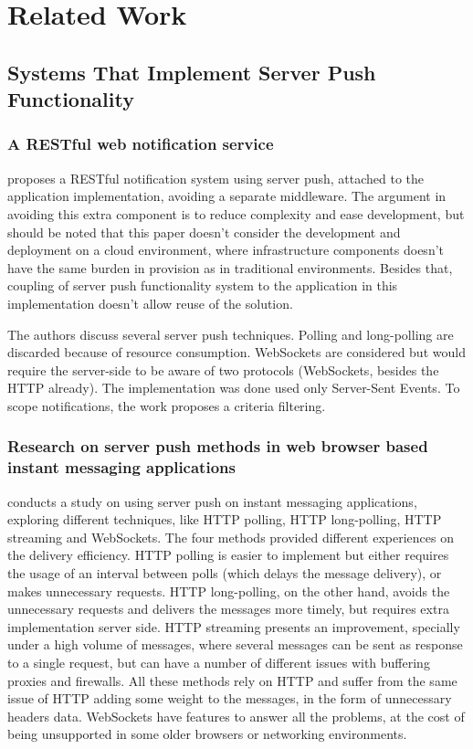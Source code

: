 \section{Related Work} \label{section-related-work}

\subsection{Systems That Implement Server Push Functionality}

\subsubsection{A RESTful web notification service}

 proposes a RESTful notification system using server push, attached to the application implementation, avoiding a separate middleware. The argument in avoiding this extra component is to reduce complexity and ease development, but should be noted that this paper doesn't consider the development and deployment on a cloud environment, where infrastructure components doesn't have the same burden in provision as in traditional environments. Besides that, coupling of server push functionality system to the application in this implementation doesn't allow reuse of the solution.

The authors discuss several server push techniques. Polling and long-polling are discarded because of resource consumption. WebSockets are considered but would require the server-side to be aware of two protocols (WebSockets, besides the HTTP already). The implementation was done used only Server-Sent Events. To scope notifications, the work proposes a criteria filtering.

\subsubsection{Research on server push methods in web browser based instant messaging applications}

 conducts a study on using server push on instant messaging applications, exploring different techniques, like HTTP polling, HTTP long-polling, HTTP streaming and WebSockets. The four methods provided different experiences on the delivery efficiency. HTTP polling is easier to implement but either requires the usage of an interval between polls (which delays the message delivery), or makes unnecessary requests. HTTP long-polling, on the other hand, avoids the unnecessary requests and delivers the messages more timely, but requires extra implementation server side. HTTP streaming presents an improvement, specially under a high volume of messages, where several messages can be sent as response to a single request, but can have a number of different issues with buffering proxies and firewalls. All these methods rely on HTTP and suffer from the same issue of HTTP adding some weight to the messages, in the form of unnecessary headers data. WebSockets have features to answer all the problems, at the cost of being unsupported in some older browsers or networking environments.


